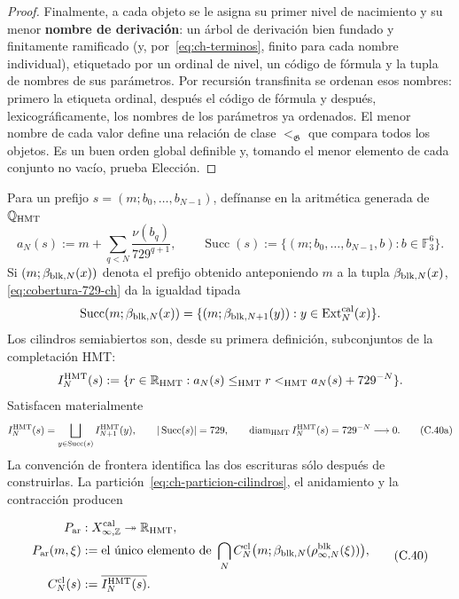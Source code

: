 \begin{proof}
Finalmente, a cada objeto se le asigna su primer nivel de nacimiento y su
menor \textbf{nombre de derivación}: un árbol de derivación bien fundado y
finitamente ramificado (y, por~\eqref{eq:ch-terminos}, finito para cada nombre individual), etiquetado por un
ordinal de nivel, un código de fórmula y la tupla de nombres de sus parámetros.
Por recursión transfinita se ordenan esos nombres: primero la etiqueta ordinal,
después el código de fórmula y después, lexicográficamente, los nombres de los
parámetros ya ordenados. El menor nombre de cada valor define una relación de
clase \(<_{\mathfrak G}\) que compara todos los objetos. Es un buen orden
global definible y, tomando el menor elemento de cada conjunto no vacío,
prueba Elección.
\end{proof}



Para un prefijo \(s=(m;b_0,\ldots,b_{N-1})\), defínanse en la aritmética
generada de \(\mathbb Q_{\rm HMT}\)
\[
 a_N(s):=m+\sum_{q<N}\frac{\nu(b_q)}{729^{q+1}},
 \qquad
 \operatorname{Succ}(s):=
 \{(m;b_0,\ldots,b_{N-1},b):b\in\mathbb F_3^6\}.
\]
Si \((m;\beta_{{\rm blk},N}(x))\) denota el prefijo obtenido anteponiendo
\(m\) a la tupla \(\beta_{{\rm blk},N}(x)\),
\eqref{eq:cobertura-729-ch} da la igualdad tipada
\[
 \operatorname{Succ}(m;\beta_{{\rm blk},N}(x))
 =\{(m;\beta_{{\rm blk},N+1}(y)):
       y\in\operatorname{Ext}^{\rm cal}_N(x)\}.
\]
Los cilindros semiabiertos son, desde su primera definición, subconjuntos de
la completación HMT:
\[
 I_N^{\rm HMT}(s):=
 \{r\in\mathbb R_{\rm HMT}:
      a_N(s)\le_{\rm HMT}r<_{\rm HMT}a_N(s)+729^{-N}\}.
\]
Satisfacen materialmente
\[
 I_N^{\rm HMT}(s)=
 \bigsqcup_{y\in\operatorname{Succ}(s)}I_{N+1}^{\rm HMT}(y),
 \qquad |\operatorname{Succ}(s)|=729,
 \qquad \operatorname{diam}_{\rm HMT}I_N^{\rm HMT}(s)
      =729^{-N}\longrightarrow0.
\tag{C.40a}\label{eq:ch-particion-cilindros}
\]
La convención de frontera identifica las dos escrituras sólo después de
construirlas. La partición~\eqref{eq:ch-particion-cilindros}, el anidamiento y la contracción producen

\[
\begin{aligned}
 P_{\rm ar}&:X_{\infty,\mathbb Z}^{\rm cal}
     \twoheadrightarrow\mathbb R_{\rm HMT},\\
 P_{\rm ar}(m,\xi)
   &:=\text{el único elemento de }
     \bigcap_N C_N^{\rm cl}
       \bigl(m;\beta_{{\rm blk},N}(\rho^{\rm blk}_{\infty,N}(\xi))\bigr),\\
 C_N^{\rm cl}(s)&:=\overline{I_N^{\rm HMT}(s)}.
\end{aligned}
\tag{C.40}\label{eq:ch-proyeccion-arquimediana}
\]

